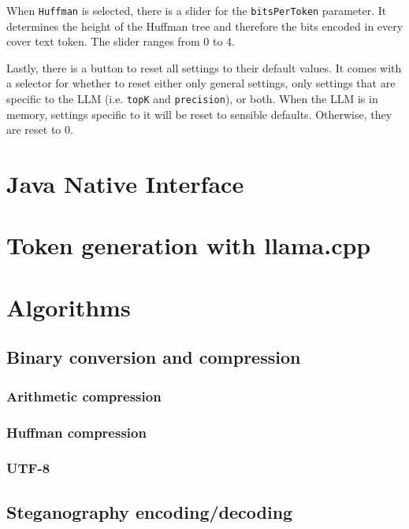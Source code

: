 When \lstinline|Huffman| is selected, there is a slider for the \lstinline|bitsPerToken| parameter. It determines the height of the Huffman tree and therefore the bits encoded in every cover text token. The slider ranges from 0 to 4.

Lastly, there is a button to reset all settings to their default values. It comes with a selector for whether to reset either only general settings, only settings that are specific to the \gls{LLM} (i.e. \lstinline|topK| and \lstinline|precision|), or both. When the \gls{LLM} is in memory, settings specific to it will be reset to sensible defaults. Otherwise, they are reset to 0.

\section{Java Native Interface}
\label{sec:jni}

\section{Token generation with llama.cpp}
\label{sec:tokenGenerationWithLlamaCpp}

\section{Algorithms}
\label{sec:algorithms}

\subsection{Binary conversion and compression}
\label{sec:binaryConversionAndCompression}

\subsubsection{Arithmetic compression}
\label{sec:arithmeticCompression}

\subsubsection{Huffman compression}
\label{sec:huffmanCompression}

\subsubsection{UTF-8}
\label{sec:utf8}

\subsection{Steganography encoding/decoding}
\label{sec:steganographyEncodingDecoding}

